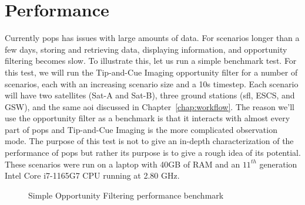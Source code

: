  
%

\section{Performance}\label{sec:performance}

Currently \gls{pops} has issues with large amounts of data. For scenarios
longer than a few days, storing and retrieving data, displaying information,
and opportunity filtering becomes slow. To illustrate this, let us run a simple
benchmark test. For this test, we will run the Tip-and-Cue Imaging opportunity
filter for a number of scenarios, each with an increasing scenario size and a
10s timestep. Each scenario will have two satellites (Sat-A and Sat-B), three
ground stations (\acrshort{sfl}, ESCS, and GSW), and the same \gls{aoi}
discussed in Chapter~\ref{chap:workflow}. The reason we'll use the opportunity
filter as a benchmark is that it interacts with almost every part of \gls{pops}
and Tip-and-Cue Imaging is the more complicated observation mode.
The purpose of this test is not to give an in-depth characterization of the
performance of \gls{pops} but rather its purpose is to give a rough idea of its
potential.  These scenarios were run on a laptop with 40GB of RAM and an
$11^{th}$ generation Intel Core i7-1165G7 CPU running at 2.80 GHz. 


\begin{figure}
    \centering
    \caption{Simple Opportunity Filtering performance benchmark}
    \label{fig:performance-benchmark}
\end{figure}

